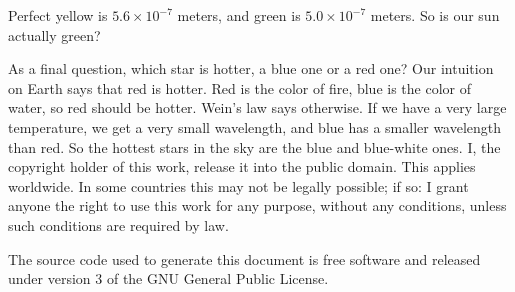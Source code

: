 \documentclass{article}
\begin{document}
    Perfect yellow is $5.6\times{10}^{-7}$ meters, and green is
    $5.0\times{10}^{-7}$ meters. So is our sun actually green?
    \par\hfill\par
    As a final question, which star is hotter, a blue one or a red one?
    Our intuition on Earth says that red is hotter. Red is the color of fire,
    blue is the color of water, so red should be hotter. Wein's law says
    otherwise. If we have a very large temperature, we get a very small
    wavelength, and blue has a smaller wavelength than red. So the hottest
    stars in the sky are the blue and blue-white ones.
    \newpage
    I, the copyright holder of this work, release it into the public domain.
    This applies worldwide. In some countries this may not be legally possible;
    if so: I grant anyone the right to use this work for any purpose, without
    any conditions, unless such conditions are required by law.
    \par\hfill\par
    The source code used to generate this document is free software and released
    under version 3 of the GNU General Public License.
\end{document}
